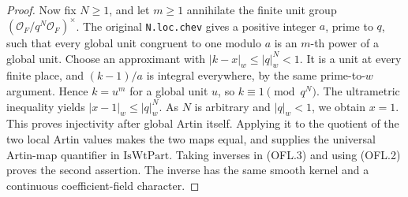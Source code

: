 \documentclass[11pt,a4paper]{article}
\numberwithin{equation}{section}
\theoremstyle{remark}\newtheorem{remark}[theorem]{Remark}
\begin{document}
\begin{proof}
Now fix \(N\ge1\), and let \(m\ge1\) annihilate the finite
unit group \((\mathcal O_F/q^N\mathcal O_F)^\times\).
The original \texttt{N.\allowbreak loc.\allowbreak chev} gives a positive integer
\(a\), prime to \(q\), such that every global unit congruent
to one modulo \(a\) is an \(m\)-th power of a global unit.
Choose an approximant with
\(|k-x|_w\le |q|_w^N<1\).  It is a unit at every finite
place, and \((k-1)/a\) is integral everywhere, by the same
prime-to-\(w\) argument.  Hence \(k=u^m\) for a global unit
\(u\), so \(k\equiv1\pmod{q^N}\).  The ultrametric
inequality yields \(|x-1|_w\le |q|_w^N\).
As \(N\) is arbitrary and \(|q|_w<1\), we obtain \(x=1\).
This proves injectivity after global Artin itself.  Applying it
to the quotient of the two local Artin values makes the two maps
equal, and supplies the universal Artin-map quantifier in
\(\mathrm{IsWtPart}\).  Taking inverses in (OFL.3)
and using (OFL.2) proves the second assertion.  The inverse has the
same smooth kernel and a continuous coefficient-field character.
\end{proof}

\end{document}
